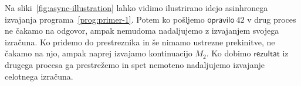 Na sliki~\ref{fig:async-illustration} lahko vidimo ilustrirano idejo asinhronega izvajanja programa~\ref{prog:primer-1}. 
Potem ko pošljemo $\mathsf{opravilo}\ 42$ v drug proces ne čakamo na odgovor, ampak nemudoma nadaljujemo z izvajanjem svojega izračuna. Ko pridemo do prestreznika in še nimamo ustrezne prekinitve, ne čakamo na njo, ampak naprej izvajamo kontinuacijo $M_2$. Ko dobimo $\mathsf{rezultat}$ iz drugega procesa ga prestrežemo in spet nemoteno nadaljujemo izvajanje celotnega izračuna.

%	

